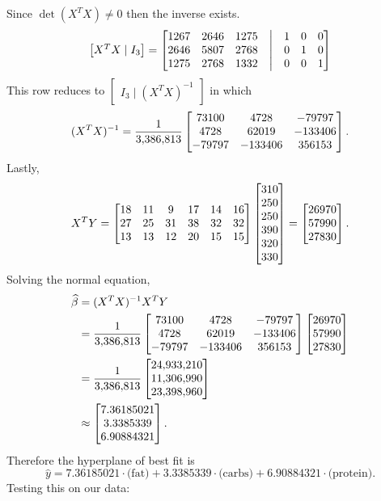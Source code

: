 Since $\det (X^TX) \neq 0$ then the inverse exists.
$$\begin{bmatrix}
    X^TX \mid I_3
\end{bmatrix} = \begin{bmatrix}
    1267 & 2646 & 1275 &\bigm| & 1 & 0 & 0 \\
    2646 & 5807 & 2768 &\bigm| & 0 & 1 & 0 \\
    1275 & 2768 & 1332 &\bigm| & 0 & 0 & 1  
\end{bmatrix}$$
This row reduces to $\displaystyle \begin{bmatrix}
    I_3 \mid (X^TX)^{-1}
\end{bmatrix}$ in which
$$(X^TX)^{-1} = \over*{\num{3386813}} \begin{bmatrix}
    73100 & 4728 & -79797\\
    4728 & 62019 & -133406\\
    -79797 & -133406 & 356153
\end{bmatrix}.$$
Lastly, 
$$X^TY = \begin{bmatrix}
    18 & 11 & 9 & 17 & 14 & 16\\
    27 & 25 & 31 & 38 & 32 & 32\\
    13 & 13 & 12 & 20 & 15 & 15
\end{bmatrix} \begin{bmatrix}
    310 \\ 250 \\ 250 \\ 390 \\ 320 \\ 330
\end{bmatrix} = \vvec*{26970}{57990}{27830}.$$
Solving the normal equation, 
\begin{align*}
    \betah &= (X^TX)^{-1}X^TY\\
    &= \over*{\num{3386813}} \begin{bmatrix}
        73100 & 4728 & -79797\\
        4728 & 62019 & -133406\\
        -79797 & -133406 & 356153
    \end{bmatrix} \vvec*{26970}{57990}{27830}\\
    &= \over*{\num{3386813}} \vvec*{\num{24933210}}{\num{11306990}}{\num{23398960}}\\
    &\approx \vvec*{7.36185021}{3.3385339}{6.90884321}.
\end{align*}
Therefore the hyperplane of best fit is
$$\widehat{y} = 7.36185021 \cdot \text{(fat)} + 3.3385339 \cdot \text{(carbs)} + 6.90884321 \cdot \text{(protein)}.$$
Testing this on our data:
